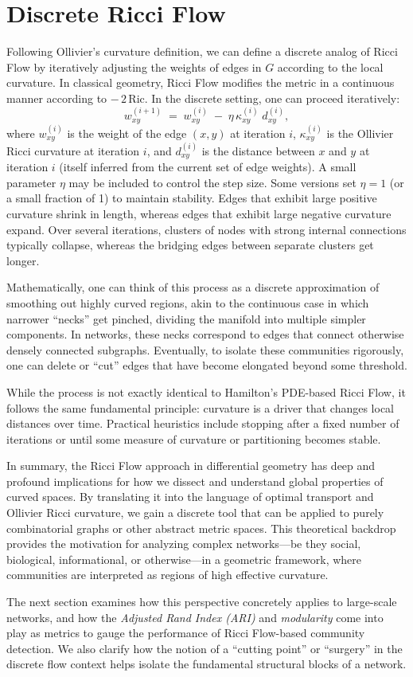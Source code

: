 \section{Discrete Ricci Flow}
Following Ollivier’s curvature definition, we can define a discrete analog of Ricci Flow by iteratively adjusting the weights of edges in $G$ according to the local curvature. In classical geometry, Ricci Flow modifies the metric in a continuous manner according to $-\,2\,\mathrm{Ric}$. In the discrete setting, one can proceed iteratively:
\[
w_{xy}^{(i+1)} \;=\; w_{xy}^{(i)} \;-\; \eta \,\kappa_{xy}^{(i)} \; d_{xy}^{(i)},
\]
where $w_{xy}^{(i)}$ is the weight of the edge $(x,y)$ at iteration $i$, $\kappa_{xy}^{(i)}$ is the Ollivier Ricci curvature at iteration $i$, and $d_{xy}^{(i)}$ is the distance between $x$ and $y$ at iteration $i$ (itself inferred from the current set of edge weights). A small parameter $\eta$ may be included to control the step size. Some versions set $\eta=1$ (or a small fraction of 1) to maintain stability. Edges that exhibit large positive curvature shrink in length, whereas edges that exhibit large negative curvature expand. Over several iterations, clusters of nodes with strong internal connections typically collapse, whereas the bridging edges between separate clusters get longer.

Mathematically, one can think of this process as a discrete approximation of smoothing out highly curved regions, akin to the continuous case in which narrower “necks” get pinched, dividing the manifold into multiple simpler components. In networks, these necks correspond to edges that connect otherwise densely connected subgraphs. Eventually, to isolate these communities rigorously, one can delete or “cut” edges that have become elongated beyond some threshold.

While the process is not exactly identical to Hamilton’s PDE-based Ricci Flow, it follows the same fundamental principle: curvature is a driver that changes local distances over time. Practical heuristics include stopping after a fixed number of iterations or until some measure of curvature or partitioning becomes stable.

In summary, the Ricci Flow approach in differential geometry has deep and profound implications for how we dissect and understand global properties of curved spaces. By translating it into the language of optimal transport and Ollivier Ricci curvature, we gain a discrete tool that can be applied to purely combinatorial graphs or other abstract metric spaces. This theoretical backdrop provides the motivation for analyzing complex networks---be they social, biological, informational, or otherwise---in a geometric framework, where communities are interpreted as regions of high effective curvature. 

The next section examines how this perspective concretely applies to large-scale networks, and how the \emph{Adjusted Rand Index (ARI)} and \emph{modularity} come into play as metrics to gauge the performance of Ricci Flow-based community detection. We also clarify how the notion of a “cutting point” or “surgery” in the discrete flow context helps isolate the fundamental structural blocks of a network.